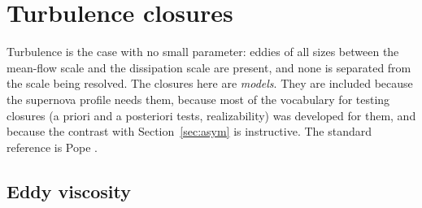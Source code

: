 \section{Turbulence closures}
\label{sec:turb}

Turbulence is the case with no small parameter: eddies of all sizes between
the mean-flow scale and the dissipation scale are present, and none is
separated from the scale being resolved. The closures here are
\emph{models}. They are included because the supernova profile needs them,
because most of the vocabulary for testing closures (a priori and a
posteriori tests, realizability) was developed for them, and because the
contrast with Section~\ref{sec:asym} is instructive. The standard reference
is Pope \cite{Pope}.

\subsection{Eddy viscosity}

